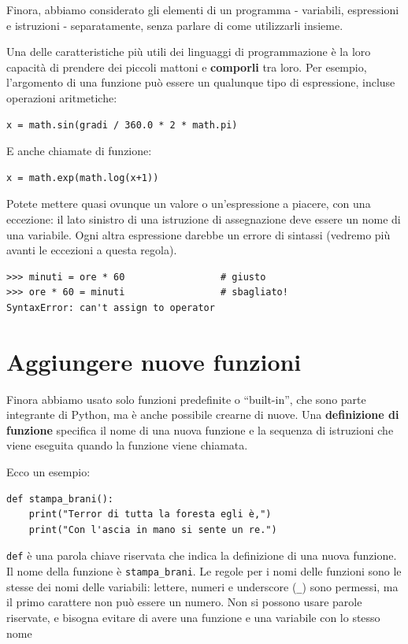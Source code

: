 \documentclass[10pt]{book}
\begin{document}
Finora, abbiamo considerato gli elementi di un programma - variabili, espressioni e istruzioni - separatamente, senza parlare di come utilizzarli insieme.

Una delle caratteristiche più utili dei linguaggi di programmazione è la loro capacità di prendere dei piccoli mattoni e {\bf comporli} tra loro. Per esempio, l'argomento di una funzione può essere un qualunque tipo di espressione, incluse operazioni aritmetiche:

\begin{verbatim}
x = math.sin(gradi / 360.0 * 2 * math.pi)
\end{verbatim}
%
E anche chiamate di funzione:

\begin{verbatim}
x = math.exp(math.log(x+1))
\end{verbatim}
%
Potete mettere quasi ovunque un valore o un'espressione a piacere, con una eccezione: il lato sinistro di una istruzione di assegnazione deve essere un nome di una variabile. Ogni altra espressione darebbe un errore di sintassi (vedremo più avanti le eccezioni a questa regola).

\begin{verbatim}
>>> minuti = ore * 60                 # giusto
>>> ore * 60 = minuti                 # sbagliato!
SyntaxError: can't assign to operator
\end{verbatim}
%


\section{Aggiungere nuove funzioni}

Finora abbiamo usato solo funzioni predefinite o ``built-in'', che sono parte integrante di Python, ma è anche possibile crearne di nuove.
Una {\bf definizione di funzione} specifica il nome di una nuova funzione e la sequenza di istruzioni che viene eseguita quando la funzione viene chiamata.

Ecco un esempio:

\begin{verbatim}
def stampa_brani():
    print("Terror di tutta la foresta egli è,")
    print("Con l'ascia in mano si sente un re.")
\end{verbatim}
%
{\tt def} è una parola chiave riservata che indica la definizione di una nuova funzione. Il nome della funzione è \verb"stampa_brani".  Le regole per i nomi delle funzioni sono le stesse dei nomi delle variabili: lettere, numeri e underscore (\verb"_") sono permessi, ma il primo carattere non può essere un numero. Non si possono usare parole riservate, e bisogna evitare di avere una funzione e una variabile con lo stesso nome
\end{document}
